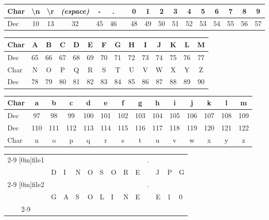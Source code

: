 \documentclass[11pt,a4paper]{article}
\begin{document}
\begin{center}
\begin{tabular}{ | l |c|c|c|c|c| c |c|c|c|c|c|c|c|c|c|c| }
\hline
Char & \textbackslash{}n & \textbackslash{}r & { \small \textit{(espace)} } &  - &  . &   & 0 &  1 &  2 &  3 &  4 &  5 &  6 &  7 &  8 &  9 \\
\hline
Dec &         10         &        13         &         32        & 45 & 46 &   & 48 & 49 & 50 & 51 & 52 & 53 & 54 & 55 & 56 & 57 \\
\hline
\end{tabular}

\medskip

\begin{tabular}{ | l |c|c|c|c|c|c|c|c|c|c|c|c|c| }
\hline
Char &  A &  B &  C &  D &  E &  F &  G &  H &  I &  J &  K &  L &  M \\
\hline
Dec &  65 & 66 & 67 & 68 & 69 & 70 & 71 & 72 & 73 & 74 & 75 & 76 & 77 \\
\hline
\hline
Char &  N &  O &  P &  Q &  R &  S &  T &  U &  V &  W &  X &  Y &  Z \\
\hline
Dec &  78 & 79 & 80 & 81 & 82 & 83 & 84 & 85 & 86 & 87 & 88 & 89 & 90 \\
\hline
\end{tabular}

\medskip

\begin{tabular}{ | l |c|c|c|c|c|c|c|c|c|c|c|c|c| }
\hline
Char &  a &  b &  c &  d  &  e  &  f  &  g  &  h  &  i  &  j  &  k  &  l  &  m \\
\hline
Dec &  97 & 98 & 99 & 100 & 101 & 102 & 103 & 104 & 105 & 106 & 107 & 108 & 109 \\
\hline
\hline
Dec &  110 & 111 & 112 & 113 & 114 & 115 & 116 & 117 & 118 & 119 & 120 & 121 & 122 \\
\hline
Char &  n  &  o  &  p  &  q  &  r  &  s  &  t  &  u  &  v  &  w  &  x  &  y  &  z \\
\hline
\end{tabular}

\bigskip

\begin{tabular}{ c   | m{0.45cm} | m{0.45cm} | m{0.45cm} | m{0.45cm} | m{0.45cm} | m{0.45cm} | m{0.45cm} | m{0.45cm} | c | m{0.45cm} | m{0.45cm} | m{0.45cm} | }
\cline{2-9} \cline{11-13}
\multirow[r]{2}{*}[0in]{file1} & & & & & & & & &  \multirow[c]{2}{*}[0in]{.}  & & & \\
 & D & I & N & O & S & O & R & E &    & J & P & G \\
\cline{2-9} \cline{11-13}
\multirow[r]{2}{*}[0in]{file2} & & & & & & & & &  \multirow[c]{2}{*}[0in]{.}  & & & \\
 & G & A & S & O & L & I & N & E &   & E & 1 & 0 \\
\cline{2-9} \cline{11-13}
\end{tabular}

\end{center}
\end{document}
